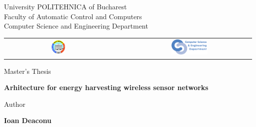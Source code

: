 


\pagestyle{empty}
\sffamily

\noindent
\begin{center}
	\Large
	University POLITEHNICA of Bucharest\\
	Faculty of Automatic Control and Computers \\
	Computer Science and Engineering Department \\
	\begin{table}[h]
		\begin{center}
			\begin{tabular}{cccc}
				\includegraphics[width=0.13\textwidth]
				{img/upb.png}
				& & &
				\includegraphics[width=0.30\textwidth]
				{img/cs.png}
			\end{tabular}
		\end{center}
	\end{table}
\end{center}

\vfill\vfill
\begin{center}
	\Large
	Master's Thesis\\
\end{center}

\vfill
\begin{center}
	\HUGE\bfseries
	Arhitecture for energy harvesting wireless sensor networks\\
	\vfill
	\large
\end{center}

\vfill
\begin{center}
	\Large
	Author
\end{center}

\begin{center}
	\huge\bfseries
	Ioan Deaconu
\end{center}

